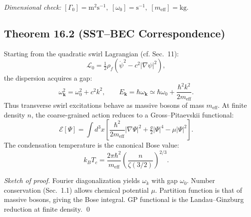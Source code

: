 \documentclass[11pt]{article}
\begin{document}
            \noindent\textit{Dimensional check:}\;
            $[\Gamma_0] = \text{m}^2\text{s}^{-1},\;
            [\omega_0]=\text{s}^{-1},\;
            [m_{\text{eff}}]=\text{kg}.$ \checkmark

        \subsection*{Theorem 16.2 (SST--BEC Correspondence)}
            Starting from the quadratic swirl Lagrangian (cf. Sec.~11):
            \begin{equation}
            \mathcal L_0 = \tfrac{1}{2}\rho_f\left(\dot\psi^2 - c^2|\nabla\psi|^2\right),
            \end{equation}
            the dispersion acquires a gap:
            \begin{equation}
            \omega_{\mathbf k}^2 = \omega_0^2 + c^2k^2,
            \qquad
            E_{\mathbf k} = \hbar \omega_{\mathbf k}
            \simeq \hbar \omega_0 + \frac{\hbar^2 k^2}{2m_{\text{eff}}}.
            \end{equation}
            Thus transverse swirl excitations behave as massive bosons of mass $m_{\text{eff}}$.
            At finite density $n$, the coarse-grained action reduces to a Gross--Pitaevskii functional:
            \begin{equation}
            \mathcal E[\Psi] = \int d^3x \left[
                                             \frac{\hbar^2}{2m_{\text{eff}}}|\nabla\Psi|^2
                + \tfrac{g}{2}|\Psi|^4 - \mu|\Psi|^2
            \right].
            \end{equation}
            The condensation temperature is the canonical Bose value:
            \begin{equation}
            k_B T_c = \frac{2\pi \hbar^2}{m_{\text{eff}}}
            \left(\frac{n}{\zeta(3/2)}\right)^{2/3}.
            \end{equation}

            \noindent\textit{Sketch of proof.}\;
            Fourier diagonalization yields $\omega_k$ with gap $\omega_0$.
            Number conservation (Sec.~1.1) allows chemical potential $\mu$.
            Partition function is that of massive bosons, giving the Bose integral.
            GP functional is the Landau--Ginzburg reduction at finite density. \qed

\end{document}
